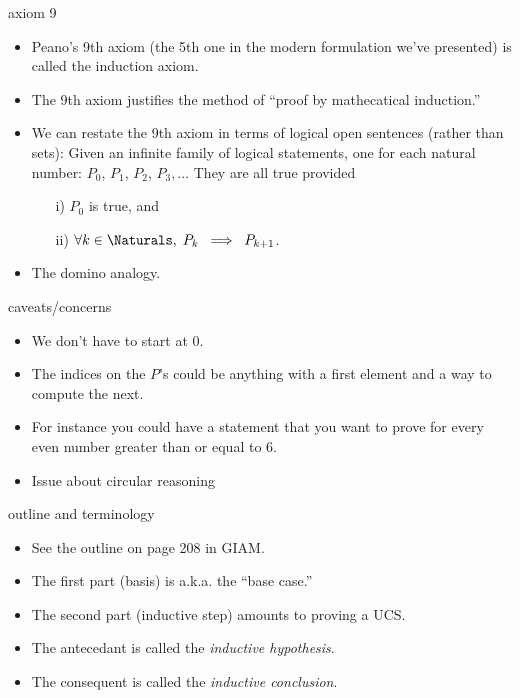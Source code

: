 \documentclass[handout,landscape]{beamer}
\begin{document}
\begin{frame}{axiom 9}
\begin{itemize}
\item Peano's 9th axiom (the 5th one in the modern formulation we've presented) is called the induction axiom. \pause
\item The 9th axiom justifies the method of ``proof by mathecatical induction.''  \pause
\item We can restate the 9th axiom in terms of logical open sentences (rather than sets): \pause \newline
Given an infinite family of logical statements, one for each natural number: $P_0$, $P_1$, $P_2$, $P_3, \ldots$ \pause \newline
They are all true provided
\begin{enumerate}
\item[i)] $P_0$ is true, and
\item[ii)]  $\forall k \in \Naturals, \; P_k \; \implies \; P_{k+1}$.
\end{enumerate}
\pause
\item The domino analogy.
\end{itemize}
\end{frame}

\begin{frame}{caveats/concerns}
\begin{itemize}
\item We don't have to start at $0$. \pause
\item The indices on the $P$'s could be anything with a first element and a way to compute the next. \pause
\item For instance you could have a statement that you want to prove for every even number greater than or equal to 6. \pause
\item Issue about circular reasoning
\end{itemize}
\end{frame}

\begin{frame}{outline and terminology}
\begin{itemize}
\item See the outline on page 208 in GIAM. \pause
\item The first part (basis) is a.k.a. the ``base case.'' \pause
\item The second part (inductive step) amounts to proving a UCS. \pause
\item The antecedant is called the {\em inductive hypothesis}. \pause
\item The consequent is called the {\em inductive conclusion}.
\end{itemize}
\end{frame}
\end{document}
